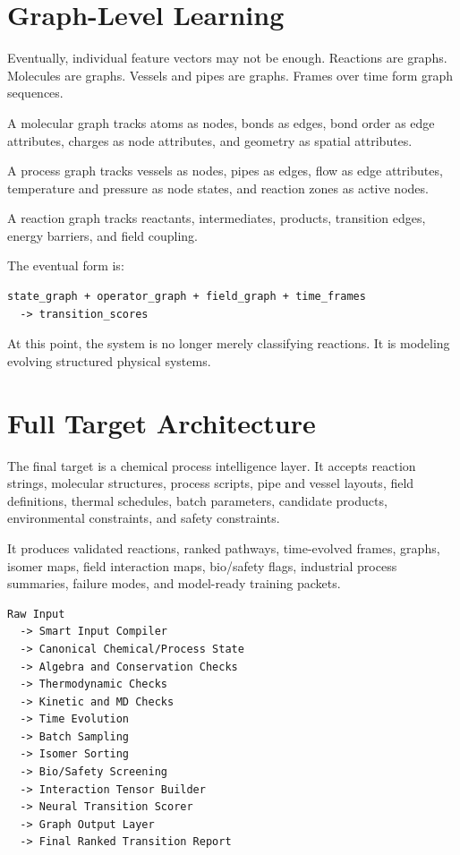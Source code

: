 \documentclass[11pt]{article}
\begin{document}
\section{Graph-Level Learning}

Eventually, individual feature vectors may not be enough. Reactions are graphs. Molecules are graphs. Vessels and pipes are graphs. Frames over time form graph sequences.

A molecular graph tracks atoms as nodes, bonds as edges, bond order as edge attributes, charges as node attributes, and geometry as spatial attributes.

A process graph tracks vessels as nodes, pipes as edges, flow as edge attributes, temperature and pressure as node states, and reaction zones as active nodes.

A reaction graph tracks reactants, intermediates, products, transition edges, energy barriers, and field coupling.

The eventual form is:

\begin{lstlisting}[caption={Graph-level transition form}]
state_graph + operator_graph + field_graph + time_frames
  -> transition_scores
\end{lstlisting}

At this point, the system is no longer merely classifying reactions. It is modeling evolving structured physical systems.

\section{Full Target Architecture}

The final target is a chemical process intelligence layer. It accepts reaction strings, molecular structures, process scripts, pipe and vessel layouts, field definitions, thermal schedules, batch parameters, candidate products, environmental constraints, and safety constraints.

It produces validated reactions, ranked pathways, time-evolved frames, graphs, isomer maps, field interaction maps, bio/safety flags, industrial process summaries, failure modes, and model-ready training packets.

\begin{lstlisting}[caption={Full target architecture}]
Raw Input
  -> Smart Input Compiler
  -> Canonical Chemical/Process State
  -> Algebra and Conservation Checks
  -> Thermodynamic Checks
  -> Kinetic and MD Checks
  -> Time Evolution
  -> Batch Sampling
  -> Isomer Sorting
  -> Bio/Safety Screening
  -> Interaction Tensor Builder
  -> Neural Transition Scorer
  -> Graph Output Layer
  -> Final Ranked Transition Report
\end{lstlisting}
\end{document}
